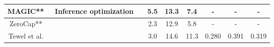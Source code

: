 \begin{table*}[!t]
{\begin{tabular}{@{}c|c|c|ccc|ccc@{}}
        MAGIC**~\cite{su2022language} & Inference optimization & & 5.5 & 13.3 & 7.4 & - & - & - \\
        \midrule
        ZeroCap**~\cite{tewel2021zero} &  & & 2.3 & 12.9 & 5.8 & - & - & - \\
        Tewel et al.~\cite{Tewel_2023_BMVC} & &  & 3.0 & 14.6 & 11.3 & 0.280 & 0.391 & 0.319 \\
        
        \bottomrule
    \end{tabular}
	}
\end{table*}
\fi

